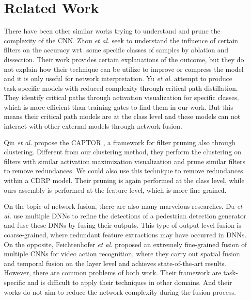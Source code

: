 \documentclass[sigplan,10pt,review]{acmart}\settopmatter{printfolios=true,printccs=false,printacmref=false}
\begin{document}
\section{Related Work}
There have been other similar works trying to understand and prune the complexity of the CNN.
Zhou \textit{et al.} \cite{zhou2018interpreting} \cite{zhou2018revisiting} seek to understand the influence of certain filters on the accuracy wrt. some specific classes of samples by ablation and dissection.
Their work provides certain explanations of the outcome, but they do not explain how their technique can be utilize to improve or compress the model and it is only useful for network interpretation.
Yu \textit{et al.} \cite{yu2018distilling} attempt to produce task-specific models with reduced complexity through critical path distillation.
They identify critical paths through activation visualization for specific classes, which is more efficient than training gates to find them in our work.
But this means their critical path models are at the class level and these models can not interact with other external models through network fusion.

Qin \textit{et al.} propose the CAPTOR \cite{qin2019captor}, a framework for filter pruning also through clustering.
Different from our clustering method, they perform the clustering on filters with similar activation maximization visualization and prune similar filters to remove redundances.
We could also use this technique to remove redundances within a CDRP model.
Their pruning is again performed at the class level, while ours assembly is performed at the feature level, which is more fine-grained.

On the topic of network fusion, there are also many marvelous researches.
Du \textit{et al.} \cite{du2017fused} use multiple DNNs to refine the detections of a pedestrian detection generator and fuse these DNNs by fusing their outputs.
This type of output level fusion is coarse-grained, where redundant feature extractions may have occurred in DNNs.
On the opposite, Feichtenhofer \textit{et al.} \cite{feichtenhofer2016convolutional} proposed an extremely fine-grained fusion of multiple CNNs for video action recognition, where they carry out spatial fusion and temporal fusion on the layer level and achieves state-of-the-art results.
However, there are common problems of both work.
Their framework are task-specific and is difficult to apply their techniques in other domains.
And their works do not aim to reduce the network complexity during the fusion process.
\end{document}
